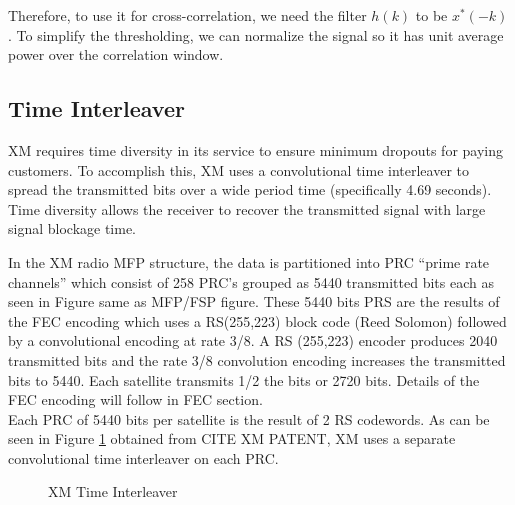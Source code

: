 \documentclass[conference,onecolumn]{IEEEtran}
\begin{document}
\noindent Therefore, to use it for cross-correlation, we need the filter $h(k)$ to be $x^*(-k)$. To simplify the thresholding, we can normalize the signal so it has unit average power over the correlation window.

\subsection{Time Interleaver}

XM requires time diversity in its service to ensure minimum dropouts for paying customers.  To accomplish this, XM uses a convolutional time interleaver to spread the transmitted bits over a wide period time (specifically 4.69 seconds).  Time diversity allows the receiver to recover the transmitted signal with large signal blockage time. 

In the XM radio MFP structure, the data is partitioned into PRC ``prime rate channels'' which consist of 258 PRC's grouped as 5440 transmitted bits each as seen in Figure {same as MFP/FSP figure}.  These 5440 bits PRS are the results of the FEC encoding which uses a RS(255,223) block code (Reed Solomon) followed by a convolutional encoding at rate 3/8.  A RS (255,223) encoder produces 2040 transmitted bits and the rate 3/8 convolution encoding increases the transmitted bits to 5440.  Each satellite transmits 1/2 the bits or 2720 bits.  Details of the FEC encoding will follow in FEC section.\\
Each PRC of 5440 bits per satellite is the result of 2 RS codewords.  As can be seen in Figure \ref{fig::time_interleaver} obtained from {CITE XM PATENT}, XM uses a separate convolutional time interleaver on each PRC.

\begin{figure}[H]
	\centerline{}
	\caption{XM Time Interleaver}
	\label{fig::time_interleaver}
\end{figure}
\end{document}
